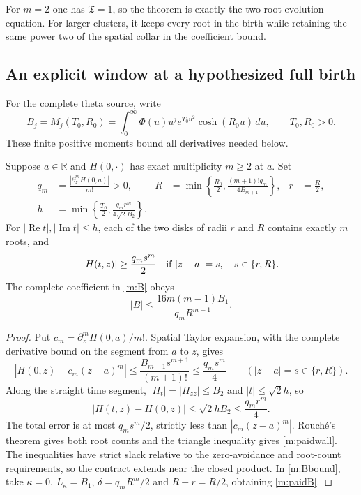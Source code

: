 For $m=2$ one has $\mathfrak T=1$, so the theorem is exactly the
two-root evolution equation.  For larger clusters, it keeps every
root in the birth while retaining the same power two of the spatial
collar in the coefficient bound.

\subsection{An explicit window at a hypothesized full birth}

For the complete theta source, write
\[
 B_j=M_j(T_0,R_0)
   =\int_0^\infty\Phi(u)u^j e^{T_0u^2}\cosh(R_0u)\,du,
 \qquad T_0,R_0>0.
\]
These finite positive moments bound all derivatives needed below.
\begin{proposition}
\label{m:window}
Suppose $a\in\mathbb R$ and $H(0,\cdot)$ has exact multiplicity
$m\geq2$ at $a$.  Set
\begin{align}
 q_m&=\frac{|\partial_z^mH(0,a)|}{m!}>0,
 &R&=\min\left\{\frac{R_0}{2},
                \frac{(m+1)!q_m}{4B_{m+1}}\right\},
 &r&=\frac R2,                                             \label{m:radii}\\
 h&=\min\left\{\frac{T_0}{2},
                \frac{q_mr^m}{4\sqrt2 B_2}\right\}.
                                                               \label{m:width}
\end{align}
For $|\operatorname{Re}t|,|\operatorname{Im}t|\leq h$, each of the
two disks of radii $r$ and $R$ contains exactly $m$ roots, and
\begin{equation}\label{m:paidwall}
 |H(t,z)|\geq\frac{q_ms^m}{2}
       \quad\hbox{if } |z-a|=s,\quad s\in\{r,R\}.
\end{equation}
The complete coefficient in \eqref{m:B} obeys
\begin{equation}\label{m:paidB}
 |B|\leq
       \frac{16m(m-1)B_1}{q_mR^{m+1}}.
\end{equation}
\end{proposition}

\begin{proof}
Put $c_m=\partial_z^mH(0,a)/m!$.  Spatial Taylor expansion, with the
complete derivative bound on the segment from $a$ to $z$, gives
\[
 |H(0,z)-c_m(z-a)^m|
 \leq\frac{B_{m+1}s^{m+1}}{(m+1)!}
 \leq\frac{q_ms^m}{4} \qquad (|z-a|=s\in\{r,R\}).
\]
Along the straight time segment, $|H_t|=|H_{zz}|\leq B_2$ and
$|t|\leq\sqrt2h$, so
\[
 |H(t,z)-H(0,z)|\leq\sqrt2hB_2\leq\frac{q_mr^m}{4}.
\]
The total error is at most $q_ms^m/2$, strictly less than
$|c_m(z-a)^m|$.  Rouch\'e's theorem gives both root counts and the
triangle inequality gives \eqref{m:paidwall}.  The inequalities have
strict slack relative to the zero-avoidance and root-count requirements,
so the contract extends near the closed product.  In
\eqref{m:Bbound}, take $\kappa=0$, $L_\kappa=B_1$,
$\delta=q_mR^m/2$ and $R-r=R/2$, obtaining \eqref{m:paidB}.
\end{proof}


